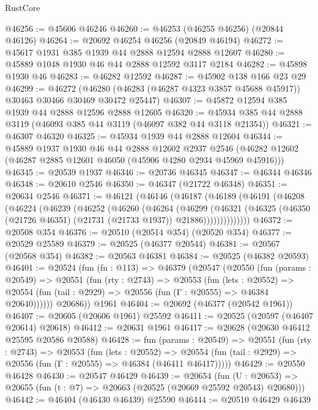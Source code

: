 \begin{lexlean}{RustCore}
\begin{coremodule}
@46256 := @45606 @46246
@46260 := @46253 (@46255 @46256) (@20844 @46126)
@46264 := @20692 @46254 @46256 (@20849 @46194)
@46272 := @45617 @1931 @385 @1939 @44 @2888 @12594 @2888 @12607
@46280 := @45889 @1048 @1930 @46 @44 @2888 @12592 @3117 @2184
@46282 := @45898 @1930 @46
@46283 := @46282 @12592
@46287 := @45902 @138 @166 @23 @29
@46299 := @46272
    (@46280 (@46283 (@46287 @4323 @3857 @45688 @45917)) @30463 @30466 @30469 @30472 @25447)
@46307 := @45872 @12594 @385 @1939 @44 @2888 @12596 @2888 @12605
@46320 := @45934 @385 @44 @2888 @3119 (@46093 @385 @44 @3119 (@46097 @382 @44 @3118 @21354))
@46321 := @46307 @46320
@46325 := @45934 @1939 @44 @2888 @12604
@46344 := @45889
    @1937
    @1930
    @46
    @44
    @2888
    @12602
    @2937
    @2546
    (@46282 @12602 (@46287 @2885 @12601 @46050 (@45906 @4280 @2934 @45969 @45916)))
@46345 := @20539 @1937
@46346 := @20736 @46345
@46347 := @46344 @46346
@46348 := @20610 @2546
@46350 := @46347 (@21722 @46348)
@46351 := @20634 @2546
@46371 := @46121
    (@46146
      (@46187
        (@46189
          (@46191
            (@46208
              (@46224
                (@46239
                  (@46252
                    (@46260
                      (@46264
                        (@46299
                          (@46321
                            (@46325
                              (@46350 (@21726 @46351) (@21731 (@21733 @1937)) @21886))))))))))))))
@46372 := @20508 @354
@46376 := @20510 (@20514 @354) (@20520 @354)
@46377 := @20529 @25589
@46379 := @20525 (@46377 @20544)
@46381 := @20567 (@20568 @354)
@46382 := @20563 @46381
@46384 := @20525 (@46382 @20593)
@46401 := @20524
    (fun (fn : @113) =>
    @46379
      (@20547
        (@20550
          (fun (params : @20549) =>
          @20551
            (fun (rty : @2743) =>
            @20553
              (fun (lets : @20552) =>
              @20554 (fun (tail : @2929) => @20556 (fun (Γ : @20555) => @46384 @20640))))))
        @20686))
    @1961
@46404 := @20692 (@46377 (@20542 @1961))
@46407 := @20605 (@20606 @1961) @25592
@46411 := @20525 (@20597 (@46407 @20614) @20618)
@46412 := @20631 @1961
@46417 := @20628 (@20630 @46412 @25595 @20586 @20588)
@46428 := fun (params : @20549) =>
  @20551
    (fun (rty : @2743) =>
    @20553
      (fun (lets : @20552) =>
      @20554 (fun (tail : @2929) => @20556 (fun (Γ : @20555) => @46384 (@46411 @46417)))))
@46429 := @20550 @46428
@46430 := @20547 @46429
@46439 := @20654
    (fun (U : @20653) => @20655 (fun (t : @7) => @20663 (@20525 (@20669 @25592 @20543) @20680)))
@46442 := @46404 (@46430 @46439) @25590
@46444 := @20510 @46429 @46439

\end{coremodule}
\end{lexlean}

